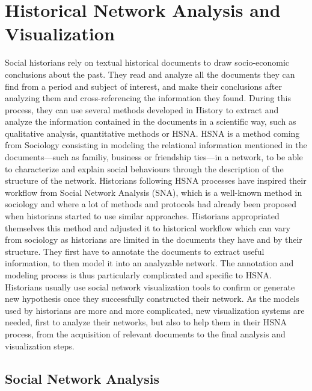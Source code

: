 
\chapter{Historical Network Analysis and Visualization}

Social historians rely on textual historical documents to draw socio-economic conclusions about the past.
They read and analyze all the documents they can find from a period and subject of interest, and make their conclusions after analyzing them and cross-referencing the information they found.
During this process, they can use several methods developed in History to extract and analyze the information contained in the documents in a scientific way, such as qualitative analysis, quantitative methods or HSNA.
HSNA is a method coming from Sociology consisting in modeling the relational information mentioned in the documents---such as familiy, business or friendship ties---in a network, to be able to characterize and explain social behaviours through the description of the structure of the network.
Historians following HSNA processes have inspired their workflow from Social Network Analysis (SNA), which is a well-known method in sociology and where a lot of methods and protocols had already been proposed when historians started to use similar approaches.
Historians appropriated themselves this method and adjusted it to historical workflow which can vary from sociology as historians are limited in the documents they have and by their structure.
They first have to annotate the documents to extract useful information, to then model it into an analyzable network.
The annotation and modeling process is thus particularly complicated and specific to HSNA.
Historians usually use social network visualization tools to confirm or generate new hypothesis once they successfully constructed their network.
As the models used by historians are more and more complicated, new visualization systems are needed, first to analyze their networks, but also to help them in their HSNA process, from the acquisition of relevant documents to the final analysis and visualization steps.



\section{Social Network Analysis}

